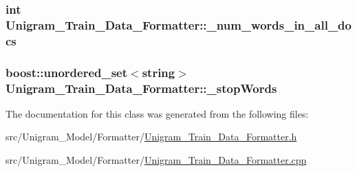 \label{class_unigram___train___data___formatter_a7f950a2118eaece102aaf7c7c50bbfa5}
\hypertarget{class_unigram___train___data___formatter_a0397b3d404743bc5211260a1d65c77af}{
\subsubsection[{\_\-num\_\-words\_\-in\_\-all\_\-docs}]{\setlength{\rightskip}{0pt plus 5cm}int {\bf Unigram\_\-Train\_\-Data\_\-Formatter::\_\-num\_\-words\_\-in\_\-all\_\-docs}}}
\label{class_unigram___train___data___formatter_a0397b3d404743bc5211260a1d65c77af}
\hypertarget{class_unigram___train___data___formatter_a46f152f878318a6d76ddf36a40e8b232}{
\subsubsection[{\_\-stopWords}]{\setlength{\rightskip}{0pt plus 5cm}boost::unordered\_\-set$<$string$>$ {\bf Unigram\_\-Train\_\-Data\_\-Formatter::\_\-stopWords}}}
\label{class_unigram___train___data___formatter_a46f152f878318a6d76ddf36a40e8b232}


The documentation for this class was generated from the following files:\begin{DoxyCompactItemize}
\item 
src/Unigram\_\-Model/Formatter/\hyperlink{_unigram___train___data___formatter_8h}{Unigram\_\-Train\_\-Data\_\-Formatter.h}\item 
src/Unigram\_\-Model/Formatter/\hyperlink{_unigram___train___data___formatter_8cpp}{Unigram\_\-Train\_\-Data\_\-Formatter.cpp}\end{DoxyCompactItemize}
